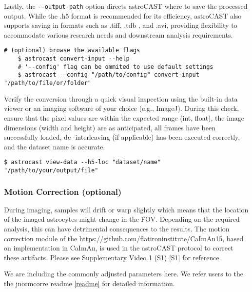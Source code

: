 Lastly, the \lstinline[style=bashStyle]{--output-path} option directs astroCAST where to save the processed output.
While the .h5 format is recommended for its efficiency, astroCAST also supports saving in formats such as .tiff, .tdb
, and .avi, providing flexibility to accommodate various research needs and downstream analysis requirements.

\begin{lstlisting}[style=bashStyle]
    # (optional) browse the available flags
    $ astrocast convert-input --help
    # '--config' flag can be ommited to use default settings
    $ astrocast -–config "/path/to/config" convert-input "/path/to/file/or/folder"
\end{lstlisting}

Verify the conversion through a quick visual inspection using the built-in data viewer or an imaging software
of your choice (e.g., ImageJ). During this check, ensure that the pixel values are within the expected range (int,
float), the image dimensions (width and height) are as anticipated, all frames have been successfully loaded, de
-interleaving (if applicable) has been executed correctly, and the dataset name is accurate.

\begin{lstlisting}[style=bashStyle]
    $ astrocast view-data --h5-loc "dataset/name" "/path/to/your/output/file"
\end{lstlisting}


\subsubsection{Motion Correction (optional)}

During imaging, samples will drift or warp slightly which means that the location of the imaged astrocytes might
change in the \ac{FOV}. Depending on the required analysis, this can have detrimental consequences to the results.
The motion correction module of the https://github.com/flatironinstitute/CaImAn15, based on implementation in CaImAn\citep{3}, is used in the astroCAST protocol to correct these artifacts. Please see Supplementary Video 1 (S1) \ref{S1} for reference.

We are including the commonly adjusted parameters here. We refer users to the the jnormcorre readme \ref{readme} for
detailed information.

